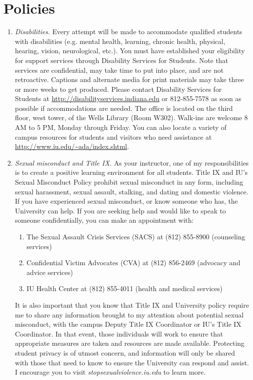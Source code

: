 \documentclass[11pt,article,oneside]{memoir} %
\begin{document}
\section{Policies}%
\begin{enumerate}%

\item \emph{Disabilities.} Every attempt will be made to accommodate qualified
students with disabilities (e.g. mental health, learning, chronic health,
physical, hearing, vision, neurological, etc.). You must have established your
eligibility for support services through Disability Services for Students. Note
that services are confidential, may take time to put into place, and are not
retroactive.  Captions and alternate media for print materials may take three
or more weeks to get produced. Please contact Disability Services for Students
at \url{http://disabilityservices.indiana.edu} or 812-855-7578 as soon as
possible if accommodations are needed. The office is located on the third
floor, west tower, of the Wells Library (Room W302). Walk-ins are welcome 8 AM
to 5 PM, Monday through Friday. You can also locate a variety of campus
resources for students and visitors who need assistance at
\url{http://www.iu.edu/~ada/index.shtml}. 

\item \emph{Sexual misconduct and Title IX.} As your instructor, one of my
responsibilities is to create a positive learning environment for all students.
Title IX and IU's Sexual Misconduct Policy prohibit sexual misconduct in any
form, including sexual harassment, sexual assault, stalking, and dating and
domestic violence.  If you have experienced sexual misconduct, or know someone
who has, the University can help. If you are seeking help and would like to
speak to someone confidentially, you can make an appointment with:

\begin{enumerate}
    
\item The Sexual Assault Crisis Services (SACS) at (812) 855-8900 (counseling services)
\item Confidential Victim Advocates (CVA) at (812) 856-2469 (advocacy and advice services)
\item IU Health Center at (812) 855-4011 (health and medical services)

\end{enumerate}

It is also important that you know that Title IX and University policy require me to share any information brought to my attention about potential sexual misconduct, with the campus Deputy Title IX Coordinator or IU's Title IX Coordinator. 
In that event, those individuals will work to ensure that appropriate measures are taken and resources are made available. 
Protecting student privacy is of utmost concern, and information will only be shared with those that need to know to ensure the University can respond and assist. 
I encourage you to visit \emph{stopsexualviolence.iu.edu} to learn more. 


\end{enumerate}
\end{document}
